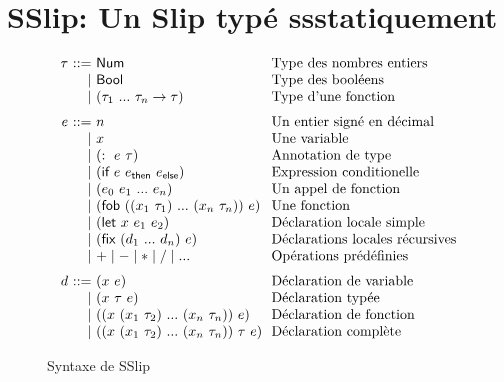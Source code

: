 \documentclass{article}
\begin{document}
\newpage
\section{SSlip: Un Slip typé ssstatiquement}

\begin{figure}
  \begin{displaymath}
    \begin{array}{r@{~}r@{~}l@{~~}l}
      \tau &::=& \kw{Num} & \text{Type des nombres entiers} \\
      &\mid& \kw{Bool} & \text{Type des booléens} \\
      &\mid& (\tau_1~...~\tau_n \to \tau) & \text{Type d'une fonction}
       \medskip \\
      e &::=& n & \text{Un entier signé en décimal} \\
      &\mid& x & \text{Une variable}  \\
      &\mid& (:~e~\tau) & \text{Annotation de type}  \\
      &\mid& (\kw{if}~e~e_{\kw{then}}~e_{\kw{else}}) &
           \text{Expression conditionelle} \\
      &\mid& (e_0~e_1~...~e_n) &
           \text{Un appel de fonction} \\
      &\mid& (\kw{fob}~((x_1~\tau_1)~...~(x_n~\tau_n))~e) & \text{Une fonction} \\
      &\mid& (\kw{let}~x~e_1~e_2) &
           \text{Déclaration locale simple} \\
      &\mid& (\kw{fix}~(d_1~...~d_n)~e) &
           \text{Déclarations locales récursives} \\
      &\mid& + \mid - \mid * \mid / \mid ... &
           \text{Opérations prédéfinies}
       \medskip \\
      d &::=& (x~e) & %
          \text{Déclaration de variable} \\
      &\mid& (x~\tau~e) & %
          \text{Déclaration typée} \\
      &\mid& ((x~(x_1~\tau_2)~...~(x_n~\tau_n))~e) &
           \text{Déclaration de fonction} \\
      &\mid& ((x~(x_1~\tau_2)~...~(x_n~\tau_n))~\tau~e) &
           \text{Déclaration complète}
    \end{array}
  \end{displaymath}
  \caption{Syntaxe de SSlip}
  \label{fig:syntaxe}
\end{figure}
\end{document}
